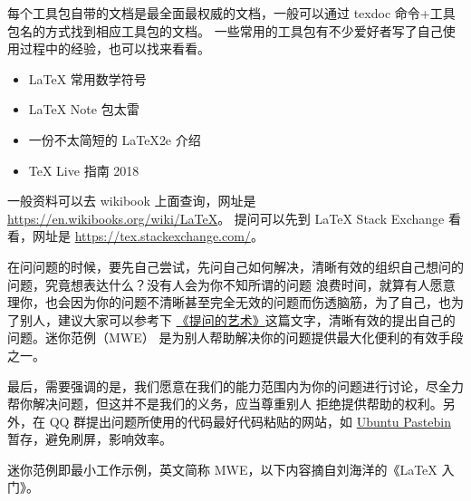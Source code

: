 





每个工具包自带的文档是最全面最权威的文档，一般可以通过 texdoc 
命令+工具包名的方式找到相应工具包的文档。
一些常用的工具包有不少爱好者写了自己使用过程中的经验，也可以找来看看。


\begin{itemize}
  \item \LaTeX{} 常用数学符号
  \item \LaTeX{} Note 包太雷
  \item 一份不太简短的 \LaTeX{2e} 介绍
  \item \TeX{} Live 指南 2018
\end{itemize}


一般资料可以去 wikibook 上面查询，网址是
\url{https://en.wikibooks.org/wiki/LaTeX}。
提问可以先到 \LaTeX{} Stack Exchange 看看，网址是
\url{https://tex.stackexchange.com/}。



在问问题的时候，要先自己尝试，先问自己如何解决，清晰有效的组织自己想问的问题，究竟想表达什么？没有人会为你不知所谓的问题
浪费时间，就算有人愿意理你，也会因为你的问题不清晰甚至完全无效的问题而伤透脑筋，为了自己，也为了别人，建议大家可以参考下
\href{https://www.jianshu.com/p/f96aa7f7bf59}{《提问的艺术》}这篇文字，清晰有效的提出自己的问题。迷你范例（MWE）
是为别人帮助解决你的问题提供最大化便利的有效手段之一。

最后，需要强调的是，我们愿意在我们的能力范围内为你的问题进行讨论，尽全力帮你解决问题，但这并不是我们的义务，应当尊重别人
拒绝提供帮助的权利。另外，在 QQ 群提出问题所使用的代码最好代码粘贴的网站，如
\href{https://paste.ubuntu.com/}{Ubuntu Pastebin}
暂存，避免刷屏，影响效率。


迷你范例即最小工作示例，英文简称 MWE，以下内容摘自刘海洋的《\LaTeX{} 入门》。


